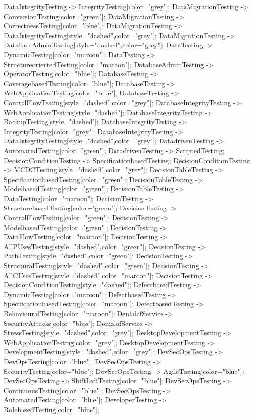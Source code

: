 \documentclass{article}
\begin{document}
{DataIntegrityTesting -> IntegrityTesting[color="grey"];
DataMigrationTesting -> ConversionTesting[color="green"];
DataMigrationTesting -> CorrectnessTesting[color="blue"];
DataMigrationTesting -> DataIntegrityTesting[style="dashed",color="grey"];
DataMigrationTesting -> DatabaseAdminTesting[style="dashed",color="grey"];
DataTesting -> DynamicTesting[color="maroon"];
DataTesting -> StructureorientedTesting[color="maroon"];
DatabaseAdminTesting -> OperatorTesting[color="blue"];
DatabaseTesting -> CoveragebasedTesting[color="blue"];
DatabaseTesting -> WebApplicationTesting[color="blue"];
DatabaseTesting -> ControlFlowTesting[style="dashed",color="grey"];
DatabaseIntegrityTesting -> WebApplicationTesting[style="dashed"];
DatabaseIntegrityTesting -> BackupTesting[style="dashed"];
DatabaseIntegrityTesting -> IntegrityTesting[color="grey"];
DatabaseIntegrityTesting -> DataIntegrityTesting[style="dashed",color="grey"];
DatadrivenTesting -> AutomatedTesting[color="green"];
DatadrivenTesting -> ScriptedTesting;
DecisionConditionTesting -> SpecificationbasedTesting;
DecisionConditionTesting -> MCDCTesting[style="dashed",color="grey"];
DecisionTableTesting -> SpecificationbasedTesting[color="green"];
DecisionTableTesting -> ModelbasedTesting[color="green"];
DecisionTableTesting -> DataTesting[color="maroon"];
DecisionTesting -> StructurebasedTesting[color="green"];
DecisionTesting -> ControlFlowTesting[color="green"];
DecisionTesting -> ModelbasedTesting[color="green"];
DecisionTesting -> DataFlowTesting[color="maroon"];
DecisionTesting -> AllPUsesTesting[style="dashed",color="green"];
DecisionTesting -> PathTesting[style="dashed",color="green"];
DecisionTesting -> StructuralTesting[style="dashed",color="green"];
DecisionTesting -> AllCUsesTesting[style="dashed",color="maroon"];
DecisionTesting -> DecisionConditionTesting[style="dashed"];
DefectbasedTesting -> DynamicTesting[color="maroon"];
DefectbasedTesting -> SpecificationbasedTesting[color="maroon"];
DefectbasedTesting -> BehaviouralTesting[color="maroon"];
DenialofService -> SecurityAttacks[color="blue"];
DenialofService -> StressTesting[style="dashed",color="grey"];
DesktopDevelopmentTesting -> WebApplicationTesting[color="grey"];
DesktopDevelopmentTesting -> DevelopmentTesting[style="dashed",color="grey"];
DevSecOpsTesting -> DevOpsTesting[color="blue"];
DevSecOpsTesting -> SecurityTesting[color="blue"];
DevSecOpsTesting -> AgileTesting[color="blue"];
DevSecOpsTesting -> ShiftLeftTesting[color="blue"];
DevSecOpsTesting -> ContinuousTesting[color="blue"];
DevSecOpsTesting -> AutomatedTesting[color="blue"];
DeveloperTesting -> RolebasedTesting[color="blue"];
}
\end{document}
